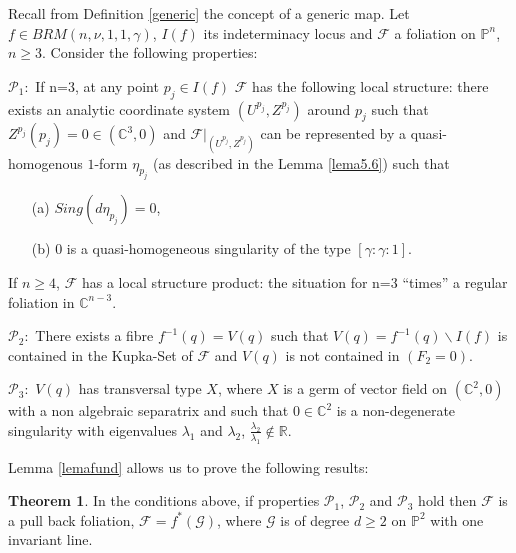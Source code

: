\documentclass{amsart}
\theoremstyle{definition}
\theoremstyle{proposition}
\numberwithin{equation}{section}
\theoremstyle{main}
\newtheorem{main}{Theorem}
\begin{document}
Recall from Definition \ref{generic} the concept of a generic map. Let \break $f  \in BRM\left(n,\nu,1,1,\gamma\right)$, $I(f)$ its indeterminacy locus and $\mathcal F$ a foliation on $\mathbb P^n$, $n\geq3$. Consider the following properties:

\begin{center}
\begin{minipage}{10cm}
$\mathcal{P}_1:$ If n=3, at any point $p_{j}\in I(f)$ $\mathcal F$ has the following local structure: there exists an analytic coordinate system $(U^{p_{j}},Z^{p_{j}})$ around $p_{j}$ such that $Z^{p_{j}}(p_{j})=0 \in ({\mathbb C^3,0})$ and $\mathcal F|_{(U^{p_{j}},Z^{p_{j}})}$ can be represented by a quasi-homogenous $1$-form $\eta_{p_{j}}$ (as described in the Lemma \ref{lema5.6}) such that
\begin{enumerate} 
\item[(a)] $Sing(d \eta_{p_{j}}) = {0}$,
\item[(b)] $0$ is a quasi-homogeneous singularity of the type $\left [{\gamma}:{\gamma}:1\right ]$.
\end{enumerate}
If $n\geq4$, $\mathcal F$ has a local structure product: the situation for n=3 ``times'' a regular foliation in ${\mathbb C^{n-3}}$.
\end{minipage}
\end{center}

\begin{center}
\begin{minipage}{10cm}
$\mathcal{P}_2:$ There exists a fibre $f^{-1}(q)=V(q)$ such that $V(q)=f^{-1}(q)\backslash I(f)$ is contained in the Kupka-Set of $\mathcal F$ and $V(q)$ is not contained in $(F_{2}=0)$.
\end{minipage}
\end{center}

\begin{center}
\begin{minipage}{10cm}
$\mathcal{P}_3:$ $V(q)$ has transversal type $X$, where $X$ is a germ of vector field on $({\mathbb C^2,0})$ with a non algebraic separatrix and such that $ 0 \in{\mathbb C^2}$ is a non-degenerate singularity with eigenvalues $\lambda_{1}$ and $\lambda_{2}$, $\frac{\lambda_{2}}{\lambda_{1}} \notin {\mathbb R}$.
\end{minipage}
\end{center}

Lemma \ref{lemafund} allows us to prove the following results:

\begin{main}\label{teoc}
In the conditions above, if properties $\mathcal{P}_1$, $\mathcal{P}_2$ and $\mathcal{P}_3$ hold then $\mathcal F$ is a pull back foliation, $\mathcal {F}= f^{*}(\mathcal{G})$, where $\mathcal{G}$ is of degree $d\geq2$ on $\mathbb P^2$ with one invariant line.  
\end{main}
\end{document}
